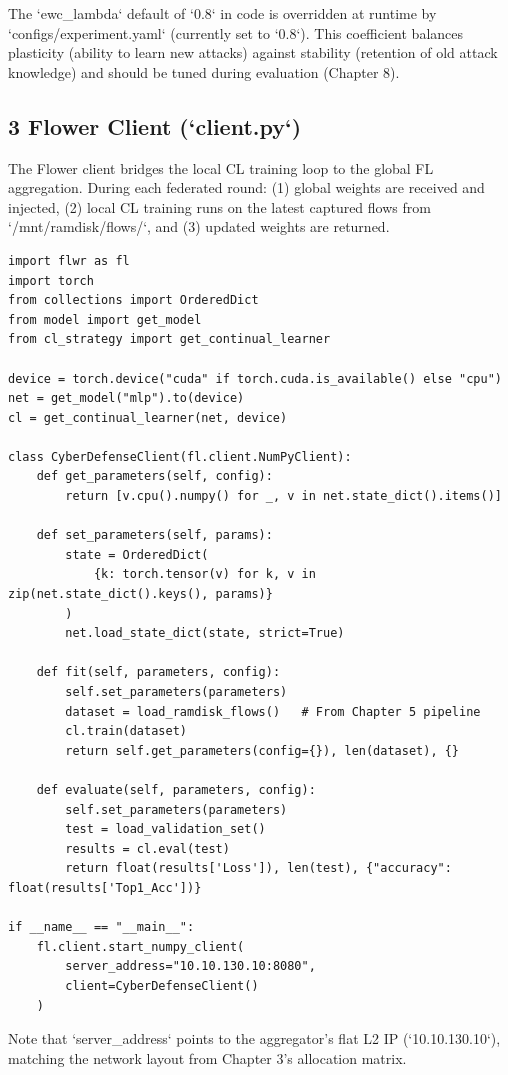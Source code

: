 \documentclass[conference]{IEEEtran}
\begin{document}
The `ewc\_lambda` default of `0.8` in code is overridden at runtime by `configs/experiment.yaml` (currently set to `0.8`). This coefficient balances plasticity (ability to learn new attacks) against stability (retention of old attack knowledge) and should be tuned during evaluation (Chapter 8).


\subsection{3 Flower Client (`client.py`)}

The Flower client bridges the local CL training loop to the global FL aggregation. During each federated round: (1) global weights are received and injected, (2) local CL training runs on the latest captured flows from `/mnt/ramdisk/flows/`, and (3) updated weights are returned.

\begin{verbatim}
import flwr as fl
import torch
from collections import OrderedDict
from model import get_model
from cl_strategy import get_continual_learner

device = torch.device("cuda" if torch.cuda.is_available() else "cpu")
net = get_model("mlp").to(device)
cl = get_continual_learner(net, device)

class CyberDefenseClient(fl.client.NumPyClient):
    def get_parameters(self, config):
        return [v.cpu().numpy() for _, v in net.state_dict().items()]

    def set_parameters(self, params):
        state = OrderedDict(
            {k: torch.tensor(v) for k, v in zip(net.state_dict().keys(), params)}
        )
        net.load_state_dict(state, strict=True)

    def fit(self, parameters, config):
        self.set_parameters(parameters)
        dataset = load_ramdisk_flows()   # From Chapter 5 pipeline
        cl.train(dataset)
        return self.get_parameters(config={}), len(dataset), {}

    def evaluate(self, parameters, config):
        self.set_parameters(parameters)
        test = load_validation_set()
        results = cl.eval(test)
        return float(results['Loss']), len(test), {"accuracy": float(results['Top1_Acc'])}

if __name__ == "__main__":
    fl.client.start_numpy_client(
        server_address="10.10.130.10:8080",
        client=CyberDefenseClient()
    )
\end{verbatim}

Note that `server\_address` points to the aggregator's flat L2 IP (`10.10.130.10`), matching the network layout from Chapter 3's allocation matrix.
\end{document}
